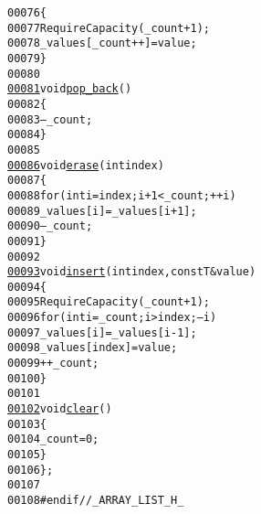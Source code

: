\begin{footnotesize}
\begin{alltt}
00076         \{
00077                 RequireCapacity(\_count + 1);
00078                 \_values[\_count++] = value;
00079         \}
00080 
\hypertarget{_array_list_8h_source_l00081}{}\hyperlink{class_array_list_ad98cc674ef8dcc42f53b4836416a289c}{00081}         \textcolor{keywordtype}{void} \hyperlink{class_array_list_ad98cc674ef8dcc42f53b4836416a289c}{pop_back}()
00082         \{
00083                 --\_count;
00084         \}
00085 
\hypertarget{_array_list_8h_source_l00086}{}\hyperlink{class_array_list_a18695cf2c26e9c6ef585ec77afc19fc6}{00086}         \textcolor{keywordtype}{void} \hyperlink{class_array_list_a18695cf2c26e9c6ef585ec77afc19fc6}{erase}(\textcolor{keywordtype}{int} index)
00087         \{
00088                 \textcolor{keywordflow}{for} (\textcolor{keywordtype}{int} i = index; i + 1 < \_count; ++i)
00089                         \_values[i] = \_values[i + 1];
00090                 --\_count;
00091         \}
00092 
\hypertarget{_array_list_8h_source_l00093}{}\hyperlink{class_array_list_addb12a5554260fa1f386160ce8534db0}{00093}         \textcolor{keywordtype}{void} \hyperlink{class_array_list_addb12a5554260fa1f386160ce8534db0}{insert}(\textcolor{keywordtype}{int} index, \textcolor{keyword}{const} T&value)
00094         \{
00095                 RequireCapacity(\_count + 1);
00096                 \textcolor{keywordflow}{for} (\textcolor{keywordtype}{int} i = \_count; i > index; --i)
00097                         \_values[i] = \_values[i - 1];
00098                 \_values[index] = value;
00099                 ++\_count;
00100         \}
00101 
\hypertarget{_array_list_8h_source_l00102}{}\hyperlink{class_array_list_acb53d54675318c94332d0ec8b6819eb3}{00102}         \textcolor{keywordtype}{void} \hyperlink{class_array_list_acb53d54675318c94332d0ec8b6819eb3}{clear}()
00103         \{
00104                 \_count = 0;
00105         \}
00106 \};
00107 
00108 \textcolor{preprocessor}{#endif //\_ARRAY\_LIST\_H\_ }
\end{alltt}\end{footnotesize}
